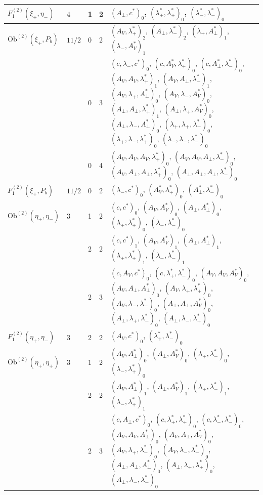 \documentclass[11pt]{article}
\numberwithin{equation}{section}
\theoremstyle{plain}
\theoremstyle{definition}
\newcommand{\Ob}{\mathrm{Ob}}
\begin{document}
{\begin{longtable}{>{\raggedright}p{2.3cm}|p{0.6cm}|p{0.25cm}|p{0.25cm}|>{\raggedright\arraybackslash}p{11.6cm}}
\hline
$F_1^{(2)}(\xi_+,\eta_-)$ & $4$ & 1 & 2 & $(A_\perp,c^*)_{0}$, $(\lambda^*_+,\lambda^*_+)_{0}$, $(\lambda^*_-,\lambda^*_-)_{0}$ \\
\hline
$\Ob^{(2)}(\xi_+,P_b)$ & $11/2$ & 0 & 2 & $(A_V,\lambda^*_+)_{2}$, $(A_\perp,\lambda^*_-)_{2}$, $(\lambda_+,A^*_\perp)_{1}$, $(\lambda_-,A^*_V)_{1}$ \\
 &  & 0 & 3 & $(c,\lambda_-,c^*)_{0}$, $(c,A^*_V,\lambda^*_+)_{0}$, $(c,A^*_\perp,\lambda^*_-)_{0}$, $(A_V,A_V,\lambda^*_+)_{1}$, $(A_V,A_\perp,\lambda^*_-)_{1}$, $(A_V,\lambda_+,A^*_\perp)_{0}$, $(A_V,\lambda_-,A^*_V)_{0}$, $(A_\perp,A_\perp,\lambda^*_+)_{1}$, $(A_\perp,\lambda_+,A^*_V)_{0}$, $(A_\perp,\lambda_-,A^*_\perp)_{0}$, $(\lambda_+,\lambda_+,\lambda^*_-)_{0}$, $(\lambda_+,\lambda_-,\lambda^*_+)_{0}$, $(\lambda_-,\lambda_-,\lambda^*_-)_{0}$ \\
 &  & 0 & 4 & $(A_V,A_V,A_V,\lambda^*_+)_{0}$, $(A_V,A_V,A_\perp,\lambda^*_-)_{0}$, $(A_V,A_\perp,A_\perp,\lambda^*_+)_{0}$, $(A_\perp,A_\perp,A_\perp,\lambda^*_-)_{0}$ \\
\hline
$F_1^{(2)}(\xi_+,P_b)$ & $11/2$ & 0 & 2 & $(\lambda_-,c^*)_{0}$, $(A^*_V,\lambda^*_+)_{0}$, $(A^*_\perp,\lambda^*_-)_{0}$ \\
\hline
$\Ob^{(2)}(\eta_+,\eta_-)$ & $3$ & 1 & 2 & $(c,c^*)_{0}$, $(A_V,A^*_V)_{0}$, $(A_\perp,A^*_\perp)_{0}$, $(\lambda_+,\lambda^*_+)_{0}$, $(\lambda_-,\lambda^*_-)_{0}$ \\
 &  & 2 & 2 & $(c,c^*)_{1}$, $(A_V,A^*_V)_{1}$, $(A_\perp,A^*_\perp)_{1}$, $(\lambda_+,\lambda^*_+)_{1}$, $(\lambda_-,\lambda^*_-)_{1}$ \\
 &  & 2 & 3 & $(c,A_V,c^*)_{0}$, $(c,\lambda^*_+,\lambda^*_-)_{0}$, $(A_V,A_V,A^*_V)_{0}$, $(A_V,A_\perp,A^*_\perp)_{0}$, $(A_V,\lambda_+,\lambda^*_+)_{0}$, $(A_V,\lambda_-,\lambda^*_-)_{0}$, $(A_\perp,A_\perp,A^*_V)_{0}$, $(A_\perp,\lambda_+,\lambda^*_-)_{0}$, $(A_\perp,\lambda_-,\lambda^*_+)_{0}$ \\
\hline
$F_1^{(2)}(\eta_+,\eta_-)$ & $3$ & 2 & 2 & $(A_V,c^*)_{0}$, $(\lambda^*_+,\lambda^*_-)_{0}$ \\
\hline
$\Ob^{(2)}(\eta_+,\eta_+)$ & $3$ & 1 & 2 & $(A_V,A^*_\perp)_{0}$, $(A_\perp,A^*_V)_{0}$, $(\lambda_+,\lambda^*_-)_{0}$, $(\lambda_-,\lambda^*_+)_{0}$ \\
 &  & 2 & 2 & $(A_V,A^*_\perp)_{1}$, $(A_\perp,A^*_V)_{1}$, $(\lambda_+,\lambda^*_-)_{1}$, $(\lambda_-,\lambda^*_+)_{1}$ \\
 &  & 2 & 3 & $(c,A_\perp,c^*)_{0}$, $(c,\lambda^*_+,\lambda^*_+)_{0}$, $(c,\lambda^*_-,\lambda^*_-)_{0}$, $(A_V,A_V,A^*_\perp)_{0}$, $(A_V,A_\perp,A^*_V)_{0}$, $(A_V,\lambda_+,\lambda^*_-)_{0}$, $(A_V,\lambda_-,\lambda^*_+)_{0}$, $(A_\perp,A_\perp,A^*_\perp)_{0}$, $(A_\perp,\lambda_+,\lambda^*_+)_{0}$, $(A_\perp,\lambda_-,\lambda^*_-)_{0}$ \\

\end{longtable}}
\end{document}
